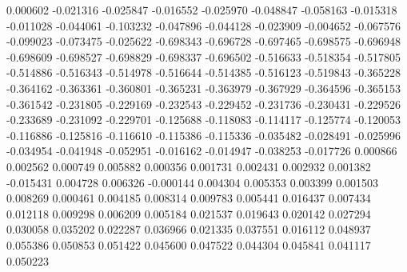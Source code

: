 0.000602
-0.021316
-0.025847
-0.016552
-0.025970
-0.048847
-0.058163
-0.015318
-0.011028
-0.044061
-0.103232
-0.047896
-0.044128
-0.023909
-0.004652
-0.067576
-0.099023
-0.073475
-0.025622
-0.698343
-0.696728
-0.697465
-0.698575
-0.696948
-0.698609
-0.698527
-0.698829
-0.698337
-0.696502
-0.516633
-0.518354
-0.517805
-0.514886
-0.516343
-0.514978
-0.516644
-0.514385
-0.516123
-0.519843
-0.365228
-0.364162
-0.363361
-0.360801
-0.365231
-0.363979
-0.367929
-0.364596
-0.365153
-0.361542
-0.231805
-0.229169
-0.232543
-0.229452
-0.231736
-0.230431
-0.229526
-0.233689
-0.231092
-0.229701
-0.125688
-0.118083
-0.114117
-0.125774
-0.120053
-0.116886
-0.125816
-0.116610
-0.115386
-0.115336
-0.035482
-0.028491
-0.025996
-0.034954
-0.041948
-0.052951
-0.016162
-0.014947
-0.038253
-0.017726
0.000866
0.002562
0.000749
0.005882
0.000356
0.001731
0.002431
0.002932
0.001382
-0.015431
0.004728
0.006326
-0.000144
0.004304
0.005353
0.003399
0.001503
0.008269
0.000461
0.004185
0.008314
0.009783
0.005441
0.016437
0.007434
0.012118
0.009298
0.006209
0.005184
0.021537
0.019643
0.020142
0.027294
0.030058
0.035202
0.022287
0.036966
0.021335
0.037551
0.016112
0.048937
0.055386
0.050853
0.051422
0.045600
0.047522
0.044304
0.045841
0.041117
0.050223
